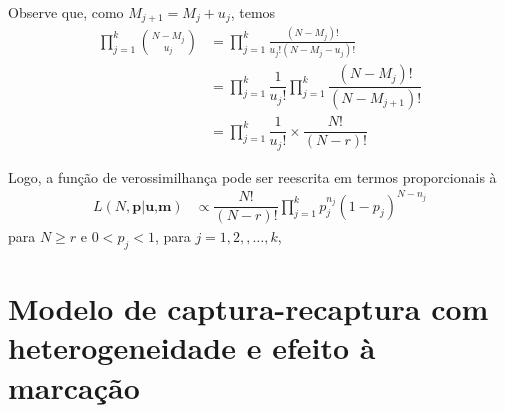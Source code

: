 \documentclass[
]{book}
\begin{document}
Observe que, como \(M_{j+1} = M_j+u_j\), temos
\begin{align*}
  \prod^k_{j=1}\binom{N-M_j}{u_j} &= \prod^k_{j=1}\frac{(N-M_j)!}{u_j!(N-M_j - u_j)!} \\
 &= \prod_{j=1}^k\dfrac{1}{u_j!}\prod_{j=1}^k\dfrac{(N-M_j)!}{(N-M_{j+1})!}\\
 &= \prod^k_{j=1}\dfrac{1}{u_j!}\times \dfrac{N!}{(N-r)!}
\end{align*}

Logo, a função de verossimilhança pode ser reescrita em termos proporcionais à
\begin{align*}
L(N,\textbf{p}|\textbf{u,m}) &\propto  \dfrac{N!}{(N-r)!}\prod^{k}_{j=1}p_j^{n_j}(1-p_j)^{N-n_j}
\end{align*}
para \(N\geq r\) e \(0<p_j<1\), para \(j=1,2,,\ldots,k\),

\hypertarget{modelo-de-captura-recaptura-com-heterogeneidade-e-efeito-uxe0-marcauxe7uxe3o}{%
\section{\texorpdfstring{Modelo de captura-recaptura com heterogeneidade e efeito à marcação}{Modelo de captura-recaptura com   heterogeneidade e efeito à marcação}}\label{modelo-de-captura-recaptura-com-heterogeneidade-e-efeito-uxe0-marcauxe7uxe3o}}

  
\end{document}
